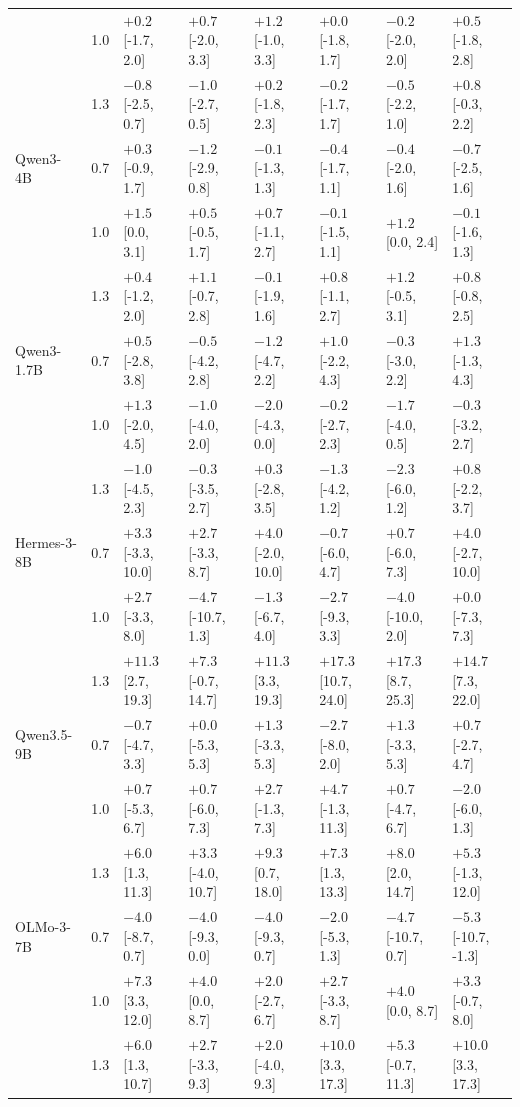 \begin{tabular}{lcllllll}
 & 1.0 & $+0.2$ [-1.7, 2.0] & $+0.7$ [-2.0, 3.3] & $+1.2$ [-1.0, 3.3] & $+0.0$ [-1.8, 1.7] & $-0.2$ [-2.0, 2.0] & $+0.5$ [-1.8, 2.8] \\
 & 1.3 & $-0.8$ [-2.5, 0.7] & $-1.0$ [-2.7, 0.5] & $+0.2$ [-1.8, 2.3] & $-0.2$ [-1.7, 1.7] & $-0.5$ [-2.2, 1.0] & $+0.8$ [-0.3, 2.2] \\
\midrule
Qwen3-4B & 0.7 & $+0.3$ [-0.9, 1.7] & $-1.2$ [-2.9, 0.8] & $-0.1$ [-1.3, 1.3] & $-0.4$ [-1.7, 1.1] & $-0.4$ [-2.0, 1.6] & $-0.7$ [-2.5, 1.6] \\
 & 1.0 & $+1.5$ [0.0, 3.1] & $+0.5$ [-0.5, 1.7] & $+0.7$ [-1.1, 2.7] & $-0.1$ [-1.5, 1.1] & $+1.2$ [0.0, 2.4] & $-0.1$ [-1.6, 1.3] \\
 & 1.3 & $+0.4$ [-1.2, 2.0] & $+1.1$ [-0.7, 2.8] & $-0.1$ [-1.9, 1.6] & $+0.8$ [-1.1, 2.7] & $+1.2$ [-0.5, 3.1] & $+0.8$ [-0.8, 2.5] \\
\midrule
Qwen3-1.7B & 0.7 & $+0.5$ [-2.8, 3.8] & $-0.5$ [-4.2, 2.8] & $-1.2$ [-4.7, 2.2] & $+1.0$ [-2.2, 4.3] & $-0.3$ [-3.0, 2.2] & $+1.3$ [-1.3, 4.3] \\
 & 1.0 & $+1.3$ [-2.0, 4.5] & $-1.0$ [-4.0, 2.0] & $-2.0$ [-4.3, 0.0] & $-0.2$ [-2.7, 2.3] & $-1.7$ [-4.0, 0.5] & $-0.3$ [-3.2, 2.7] \\
 & 1.3 & $-1.0$ [-4.5, 2.3] & $-0.3$ [-3.5, 2.7] & $+0.3$ [-2.8, 3.5] & $-1.3$ [-4.2, 1.2] & $-2.3$ [-6.0, 1.2] & $+0.8$ [-2.2, 3.7] \\
\midrule
Hermes-3-8B & 0.7 & $+3.3$ [-3.3, 10.0] & $+2.7$ [-3.3, 8.7] & $+4.0$ [-2.0, 10.0] & $-0.7$ [-6.0, 4.7] & $+0.7$ [-6.0, 7.3] & $+4.0$ [-2.7, 10.0] \\
 & 1.0 & $+2.7$ [-3.3, 8.0] & $-4.7$ [-10.7, 1.3] & $-1.3$ [-6.7, 4.0] & $-2.7$ [-9.3, 3.3] & $-4.0$ [-10.0, 2.0] & $+0.0$ [-7.3, 7.3] \\
 & 1.3 & $\mathbf{+11.3}$ [2.7, 19.3] & $+7.3$ [-0.7, 14.7] & $\mathbf{+11.3}$ [3.3, 19.3] & $\mathbf{+17.3}$ [10.7, 24.0] & $\mathbf{+17.3}$ [8.7, 25.3] & $\mathbf{+14.7}$ [7.3, 22.0] \\
\midrule
Qwen3.5-9B & 0.7 & $-0.7$ [-4.7, 3.3] & $+0.0$ [-5.3, 5.3] & $+1.3$ [-3.3, 5.3] & $-2.7$ [-8.0, 2.0] & $+1.3$ [-3.3, 5.3] & $+0.7$ [-2.7, 4.7] \\
 & 1.0 & $+0.7$ [-5.3, 6.7] & $+0.7$ [-6.0, 7.3] & $+2.7$ [-1.3, 7.3] & $+4.7$ [-1.3, 11.3] & $+0.7$ [-4.7, 6.7] & $-2.0$ [-6.0, 1.3] \\
 & 1.3 & $\mathbf{+6.0}$ [1.3, 11.3] & $+3.3$ [-4.0, 10.7] & $\mathbf{+9.3}$ [0.7, 18.0] & $\mathbf{+7.3}$ [1.3, 13.3] & $\mathbf{+8.0}$ [2.0, 14.7] & $+5.3$ [-1.3, 12.0] \\
\midrule
OLMo-3-7B & 0.7 & $-4.0$ [-8.7, 0.7] & $-4.0$ [-9.3, 0.0] & $-4.0$ [-9.3, 0.7] & $-2.0$ [-5.3, 1.3] & $-4.7$ [-10.7, 0.7] & $-5.3$ [-10.7, -1.3] \\
 & 1.0 & $\mathbf{+7.3}$ [3.3, 12.0] & $+4.0$ [0.0, 8.7] & $+2.0$ [-2.7, 6.7] & $+2.7$ [-3.3, 8.7] & $+4.0$ [0.0, 8.7] & $+3.3$ [-0.7, 8.0] \\
 & 1.3 & $\mathbf{+6.0}$ [1.3, 10.7] & $+2.7$ [-3.3, 9.3] & $+2.0$ [-4.0, 9.3] & $\mathbf{+10.0}$ [3.3, 17.3] & $+5.3$ [-0.7, 11.3] & $\mathbf{+10.0}$ [3.3, 17.3] \\
\bottomrule
\end{tabular}
